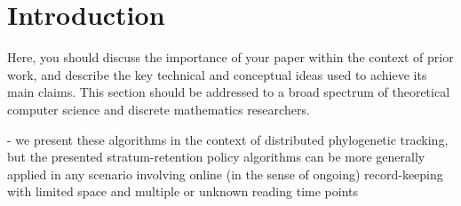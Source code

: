 \section{Introduction} \label{sec:introduction}

Here, you should discuss the importance of your paper within the context of prior work, and describe the key technical and conceptual ideas used to achieve its main claims. This section should be addressed to a broad spectrum of theoretical computer science and discrete mathematics researchers.

- we present these algorithms in the context of distributed phylogenetic tracking, but the presented stratum-retention policy algorithms can be more generally applied in any scenario involving online (in the sense of ongoing) record-keeping with limited space and multiple or unknown reading time points
